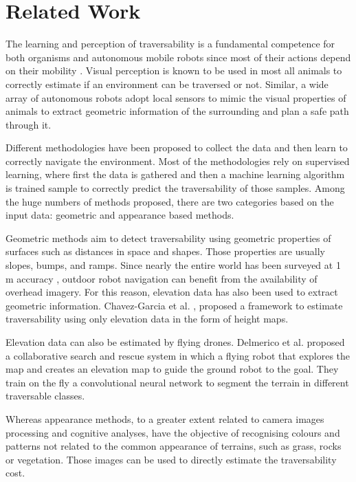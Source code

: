 \documentclass[../document.tex]{subfiles}
\begin{document}
\section{Related Work}
The learning and perception of traversability is
a fundamental competence for both organisms and autonomous mobile robots since most of their
actions depend on their mobility \cite{ugur2010traversability}. 
Visual perception is known to be used in most all animals to correctly estimate if an environment can be traversed or not.
Similar, a wide array of autonomous robots adopt local sensors to mimic the visual properties of animals to extract geometric information of the surrounding and plan a safe path through it. 

Different methodologies have been proposed to collect the data and then learn to correctly navigate the environment.
Most of the methodologies rely on supervised learning, where first the data is gathered and then a machine learning algorithm is trained sample to correctly predict the traversability of those samples.
Among the huge numbers of methods proposed, there are two categories based on the input data: geometric and appearance based methods. 

Geometric methods aim to detect traversability using geometric properties of surfaces such as distances in space and shapes. Those properties are usually slopes, bumps, and ramps. Since nearly the entire world has been surveyed at 1 m accuracy \cite{sofman2006improving}, 
outdoor robot navigation can benefit from the availability of overhead imagery. For this reason, elevation data has also been used to extract geometric information. Chavez-Garcia et al. \cite{omar2018traversability}, proposed a framework to estimate traversability using only elevation data in the form of height maps. 

Elevation data can also be estimated by flying drones. Delmerico et al. \cite{delmerico2016active} proposed a collaborative search and rescue system in which a flying robot that explores the map and creates an elevation map to guide the ground robot to the goal. They train on the fly a convolutional neural network to segment the terrain in different traversable classes.  

Whereas appearance methods, to a greater extent related to camera images processing and cognitive analyses, have the objective of recognising colours and patterns not related to the common appearance of terrains, such as grass, rocks or vegetation. Those images can be used to directly estimate the traversability cost. 
\end{document}
